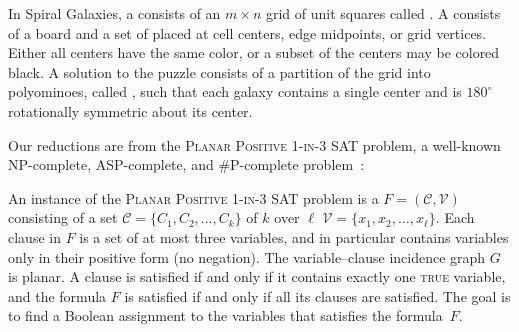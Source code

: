 In Spiral Galaxies, a  consists of an $m\times n$ grid of unit squares called .
A  consists of a board and a set of  placed at cell centers, edge midpoints, or grid vertices. Either all centers have the same color, or a subset of the centers may be colored black.
A solution to the puzzle consists of a partition of the grid into polyominoes, called , such that each galaxy contains a single center and is $180^\circ$ rotationally symmetric about its center.

Our reductions are from the \textsc{Planar Positive 1-in-3 SAT} problem, a well-known NP-complete, ASP-complete, and \#P-complete problem~\cite{dyer1986planar, mulzer08, hunt1998complexity}:
\begin{definition}
  An instance of the \textsc{Planar Positive 1-in-3 SAT} problem is a  $F = (\mathcal{C},\mathcal{V})$ consisting of a set $\mathcal{C} = \{C_1, C_2, \dots, C_k\}$ of $k$  over $\ell$  $\mathcal{V} = \{x_1, x_2, \dots, x_\ell\}$.
  Each clause in $F$ is a set of at most three variables, and in particular contains variables only in their positive form (no negation).  %
  The variable--clause incidence graph $G$ is planar. %
  A clause is satisfied if and only if it contains exactly one \textsc{true} variable, and the formula $F$ is satisfied if and only if all its clauses are satisfied.
  The goal is to find a Boolean assignment to the variables that satisfies the formula~$F$.
\end{definition}
